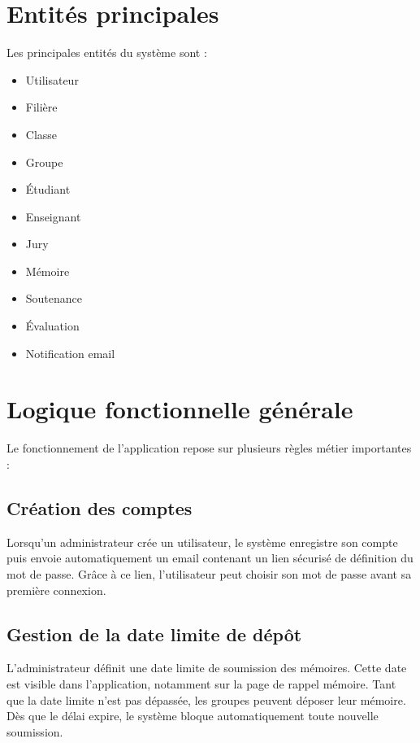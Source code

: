 \documentclass[a4paper,12pt,oneside]{report}
\begin{document}
\section{Entités principales}

Les principales entités du système sont :
\begin{itemize}
    \item Utilisateur
    \item Filière
    \item Classe
    \item Groupe
    \item Étudiant
    \item Enseignant
    \item Jury
    \item Mémoire
    \item Soutenance
    \item Évaluation
    \item Notification email
\end{itemize}

\section{Logique fonctionnelle générale}

Le fonctionnement de l'application repose sur plusieurs règles métier importantes :

\subsection{Création des comptes}

Lorsqu'un administrateur crée un utilisateur, le système enregistre son compte puis envoie automatiquement un email contenant un lien sécurisé de définition du mot de passe. Grâce à ce lien, l'utilisateur peut choisir son mot de passe avant sa première connexion.

\subsection{Gestion de la date limite de dépôt}

L'administrateur définit une date limite de soumission des mémoires. Cette date est visible dans l'application, notamment sur la page de rappel mémoire. Tant que la date limite n'est pas dépassée, les groupes peuvent déposer leur mémoire. Dès que le délai expire, le système bloque automatiquement toute nouvelle soumission.
\end{document}

